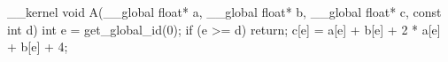 __kernel void A(__global float* a,
__global float* b,
__global float* c,
const int d) {
int e = get_global_id(0);
if (e >= d) {
return;
}
c[e] = a[e] + b[e] + 2 * a[e] + b[e] + 4;
}
